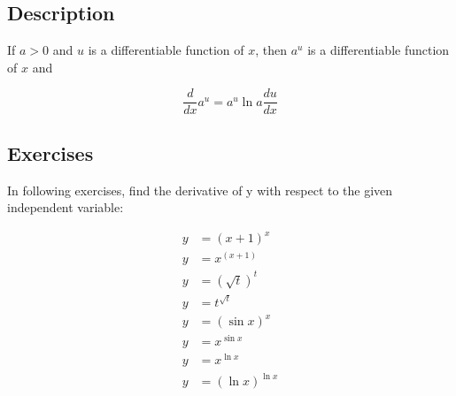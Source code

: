 \documentclass[fleqn]{article}
\begin{document}
\thispagestyle{empty}

\subsection*{Description}
\noindent
If $a > 0$ and $u$ is a differentiable function of $x$, then $a^u$ is a differentiable function of $x$ and
\newline

\begin{equation*}
\frac{d}{dx}a^u = a^u \ln a \frac{du}{dx}
\end{equation*}

\subsection*{Exercises}
\noindent
In following exercises, find the derivative of y with respect to the given independent variable:
\newline

\begin{align*}
    y &= \left(x+1\right)^x \\
    y &= x^{\left(x+1\right)} \\
    y &= \left(\sqrt{t}\right)^t \\
    y &= t^{\sqrt{t}} \\
    y &= \left(\sin{x}\right)^x \\
    y &= x^{\sin{x}} \\
    y &= x^{\ln{x}} \\
    y &= \left(\ln{x}\right)^{\ln{x}}
\end{align*}
\end{document}
